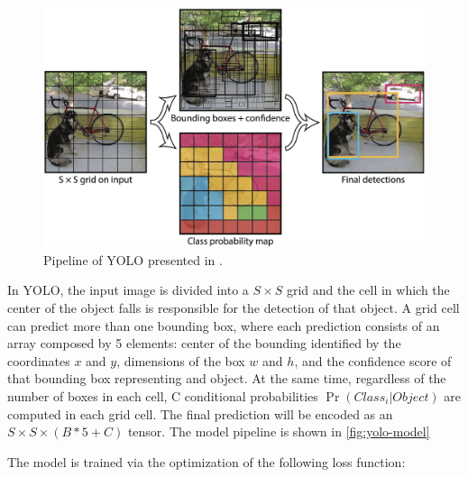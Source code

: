 \begin{figure}
    \begin{center}
        \includegraphics[width=\columnwidth]{images/yolo-model.png}
    \end{center}
    \caption{Pipeline of YOLO presented in \cite{redmon2016you}.}
    \label{fig:yolo-model}
\end{figure}

In YOLO, the input image is divided into a $S \times S$ grid and the cell in which the center of the object falls is responsible for the detection of that object.
A grid cell can predict more than one bounding box, where each prediction consists of an array composed by 5 elements: center of the bounding identified by the coordinates $x$ and $y$, dimensions of the box $w$ and $h$, and the confidence score of that bounding box representing and object. At the same time, regardless of the number of boxes in each cell, C conditional probabilities $\Pr(Class_i | Object)$ are computed in each grid cell. The final prediction will be encoded as an $S \times S \times (B * 5 + C)$ tensor. The model pipeline is shown in \autoref{fig:yolo-model}

The model is trained via the optimization of the following loss function:

